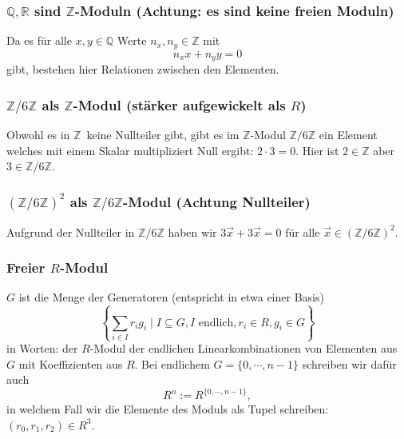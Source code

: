 \documentclass[a4paper]{amsart}
\theoremstyle{definition}
\newcommand{\R}{\ensuremath{\mathbb{ R }}}
\newcommand{\Q}{\ensuremath{\mathbb{ Q }}}
\newcommand{\Z}{\ensuremath{\mathbb{ Z }}}
\newcommand{\zz}[1]{\ensuremath{\Z /#1\Z}}
\begin{document}
\subsubsection{$\Q, \R$ sind $\Z$-Moduln (Achtung: es sind keine freien Moduln)}
Da es für alle $x,y \in \Q$ Werte $n_x, n_y \in \Z$ mit
\begin{equation}
   n_xx + n_yy = 0
\end{equation}
gibt, bestehen hier Relationen zwischen den Elementen.

\subsubsection{\zz6 als \Z-Modul (stärker aufgewickelt als $R$)}
Obwohl es in \Z\ keine Nullteiler gibt, gibt es im \Z-Modul \zz6 ein Element welches mit einem Skalar multipliziert Null ergibt: $2 \cdot 3 = 0$. Hier ist $2 \in \Z$ aber $3 \in \zz6$.

\subsubsection{$(\zz6)^2$ als \zz6-Modul (Achtung Nullteiler)}
Aufgrund der Nullteiler in \zz6 haben wir $3\vec{x} + 3\vec{x} = 0$ für alle $\vec x \in (\zz6)^2$.

\subsubsection{Freier $R$-Modul}
$G$ ist die Menge der Generatoren (entspricht in etwa einer Basis)
\begin{equation}
   \left \{ \sum_{i \in I} r_i g_i \mid I \subseteq G, I \text{ endlich}, r_i \in R, g_i \in G \right \} 
\end{equation}
in Worten: der $R$-Modul der endlichen Linearkombinationen von Elementen aus $G$ mit Koeffizienten aus $R$. Bei endlichem $G = \{0, \cdots, n-1 \}$ schreiben wir dafür auch
\begin{equation}
   R^n := R^{\{0, \cdots, n-1 \}},
\end{equation}
in welchem Fall wir die Elemente des Moduls als Tupel schreiben: $(r_0, r_1, r_2) \in R^3$.
\end{document}
